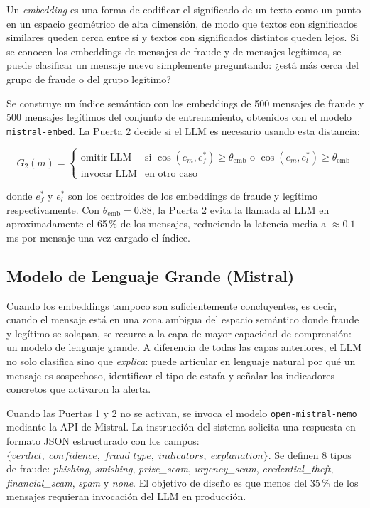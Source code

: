 \documentclass{llncs}
\begin{document}
Un \emph{embedding} es una forma de codificar el significado de
un texto como un punto en un espacio geométrico de alta dimensión,
de modo que textos con significados similares queden cerca entre sí
y textos con significados distintos queden lejos.
Si se conocen los embeddings de mensajes de fraude y de mensajes
legítimos, se puede clasificar un mensaje nuevo simplemente
preguntando: ¿está más cerca del grupo de fraude o del grupo
legítimo?

Se construye un índice semántico con los embeddings de 500 mensajes
de fraude y 500 mensajes legítimos del conjunto de entrenamiento,
obtenidos con el modelo \texttt{mistral-embed}.
La Puerta 2 decide si el LLM es necesario usando esta distancia:

\begin{equation}
  G_2(m) = \begin{cases}
    \mathrm{omitir\;LLM} & \text{si } \cos(e_m, e_f^*) \geq \theta_{\mathrm{emb}}
                                \text{ o } \cos(e_m, e_l^*) \geq \theta_{\mathrm{emb}} \\
    \mathrm{invocar\;LLM} & \text{en otro caso}
  \end{cases}
\end{equation}

donde $e_f^*$ y $e_l^*$ son los centroides de los embeddings de
fraude y legítimo respectivamente.
Con $\theta_{\mathrm{emb}}=0.88$, la Puerta 2 evita la llamada al LLM
en aproximadamente el 65\,\% de los mensajes, reduciendo la latencia
media a $\approx 0.1$\,ms por mensaje una vez cargado el índice.

\subsection{Modelo de Lenguaje Grande (Mistral)}
\label{sec:llm:llm}

Cuando los embeddings tampoco son suficientemente concluyentes,
es decir, cuando el mensaje está en una zona ambigua del espacio
semántico donde fraude y legítimo se solapan, se recurre a la
capa de mayor capacidad de comprensión: un modelo de lenguaje grande.
A diferencia de todas las capas anteriores, el LLM no solo clasifica
sino que \emph{explica}: puede articular en lenguaje natural por qué
un mensaje es sospechoso, identificar el tipo de estafa y señalar
los indicadores concretos que activaron la alerta.

Cuando las Puertas 1 y 2 no se activan, se invoca el modelo
\texttt{open-mistral-nemo} mediante la API de Mistral.
La instrucción del sistema solicita una respuesta en formato JSON
estructurado con los campos:
$\{\textit{verdict},\; \textit{confidence},\; \textit{fraud\_type},\;
\textit{indicators},\; \textit{explanation}\}$.
Se definen 8 tipos de fraude:
\textit{phishing}, \textit{smishing}, \textit{prize\_scam},
\textit{urgency\_scam}, \textit{credential\_theft},
\textit{financial\_scam}, \textit{spam} y \textit{none}.
El objetivo de diseño es que menos del 35\,\% de los mensajes
requieran invocación del LLM en producción.
\end{document}
